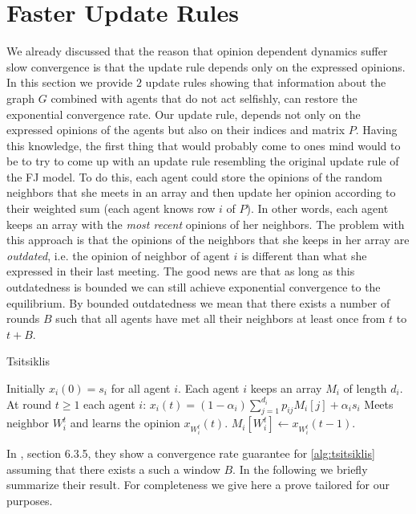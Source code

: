 \section{Faster Update Rules}\label{s:graph_aware}

We already discussed that the reason that opinion dependent dynamics suffer slow
convergence is that the update rule depends only on the expressed opinions.
In this section we provide $2$ update rules showing that information about the
graph $G$ combined with agents that do not act selfishly,
can restore the exponential convergence rate.
Our update rule, depends not only on the expressed opinions of the
agents but also on their indices and matrix $P$.
Having this knowledge, the first thing that would probably
come to ones mind would to be to try to come up with an
update rule resembling the original update rule of the FJ model.
To do this, each agent could store the opinions of the random neighbors
that she meets in an array and then update her opinion according
to their weighted sum (each agent knows row $i$ of $P$).
In other words, each agent keeps an array with the \emph{most recent}
opinions of her neighbors.
The problem with this approach is that the opinions of the neighbors
that she keeps in her array are \emph{outdated}, i.e. the opinion of
neighbor of agent $i$ is different than what she expressed in their
last meeting.  The good news are that as long as this outdatedness
is bounded we can still achieve exponential convergence to the
equilibrium.  By bounded outdatedness we mean that there exists a
number of rounds $B$ such that all agents have met all their neighbors
at least once from $t$ to $t+B$.
\begin{algorithm}
  \caption{Tsitsiklis}
  \label{alg:tsitsiklis}
  \begin{algorithmic}[1]
    \STATE Initially $x_i(0) = s_i$ for all agent $i$.
    \STATE Each agent $i$ keeps an array $M_i$ of length $d_i$.
    \STATE At round $t\geq 1$ each agent $i$:
    \bindent
    \STATE $x_i(t) = (1-\alpha_i)\sum_{j=1}^{d_i} p_{ij} M_i[j] + \alpha_is_i$
    \STATE Meets neighbor $W_i^t$ and learns the opinion $x_{W_i^t}(t)$.
    \STATE $M_i[W_i^t] \gets x_{W_i^t}(t-1)$.

    \eindent
  \end{algorithmic}
\end{algorithm}
In \cite{BT97}, section 6.3.5, they show a convergence rate guarantee for
\ref{alg:tsitsiklis} assuming that there exists a such a window $B$.
In the  following we briefly summarize their result.  For completeness we
give here a prove tailored for our purposes.

